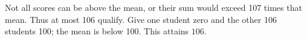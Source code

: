 Not all scores can be above the mean, or their sum would exceed 107 times that mean. Thus at most 106 qualify. Give one student zero and the other 106 students 100; the mean is below 100. This attains $\boxed{106}$.
